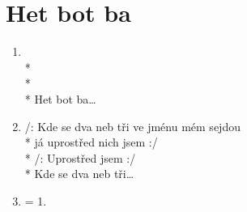\section{Het bot ba}
\begin{enumerate} 
\item \hspace{0em} \hspace*{0.75\textwidth}\\*
\hspace{0em} \hspace*{0.75\textwidth}\\*
\hspace{0em} \hspace*{0.75\textwidth}\\*
Het bot ba… 
\item /: Kde se dva neb tři ve jménu mém sejdou \\*
já uprostřed nich jsem :/ \\*
/: Uprostřed jsem :/ \\*
Kde se dva neb tři…
\item = 1.
\end{enumerate}
